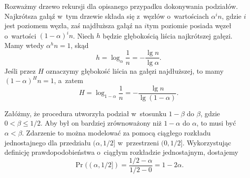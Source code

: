 \exercise %
Rozważmy drzewo rekursji dla opisanego przypadku dokonywania podziałów.
Najkrótsza gałąź w~tym drzewie składa się z~węzłów o~wartościach $\alpha^in$, gdzie $i$ jest poziomem węzła, zaś najdłuższa gałąź na $i$\nbhyphen tym poziomie posiada węzeł o~wartości $(1-\alpha)^in$.
Niech $h$ będzie głębokością liścia najkrótszej gałęzi.
Mamy wtedy $\alpha^hn=1$, skąd
\[
	h = \log_\alpha\frac{1}{n} = -\frac{\lg n}{\lg\alpha}.
\]
Jeśli przez $H$ oznaczymy głębokość liścia na gałęzi najdłuższej, to mamy $(1-\alpha)^Hn=1$, a~zatem
\[
	H = \log_{1-\alpha}\frac{1}{n} = -\frac{\lg n}{\lg(1-\alpha)}.
\]

\exercise %
Załóżmy, że procedura  utworzyła podział w~stosunku $1-\beta$ do $\beta$, gdzie $0<\beta\le1/2$.
Aby był on bardziej zrównoważony niż $1-\alpha$ do $\alpha$, to musi być $\alpha<\beta$.
Zdarzenie to można modelować za pomocą ciągłego rozkładu jednostajnego dla przedziału $(\alpha,1/2]$ w~przestrzeni $(0,1/2]$.
Wykorzystując definicję prawdopodobieństwa o~ciągłym rozkładzie jednostajnym, dostajemy
\[
	\Pr((\alpha,1/2]) = \frac{1/2-\alpha}{1/2-0} = 1-2\alpha.
\]
